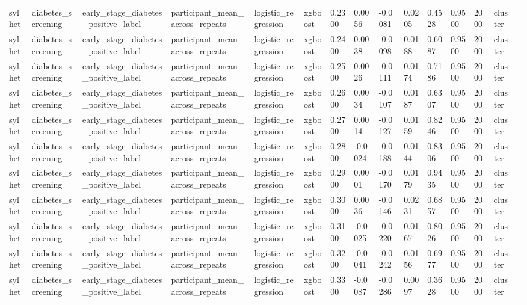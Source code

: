 \begin{tabular}{lllllllllllllll}
sylhet & diabetes\_screening & early\_stage\_diabetes\_positive\_label & participant\_mean\_across\_repeats & logistic\_regression & xgboost & 0.2300 & 0.0056 & -0.0081 & 0.0205 & 0.4528 & 0.9500 & 2000 & cluster &  \\
sylhet & diabetes\_screening & early\_stage\_diabetes\_positive\_label & participant\_mean\_across\_repeats & logistic\_regression & xgboost & 0.2400 & 0.0038 & -0.0098 & 0.0188 & 0.6087 & 0.9500 & 2000 & cluster &  \\
sylhet & diabetes\_screening & early\_stage\_diabetes\_positive\_label & participant\_mean\_across\_repeats & logistic\_regression & xgboost & 0.2500 & 0.0026 & -0.0111 & 0.0174 & 0.7186 & 0.9500 & 2000 & cluster &  \\
sylhet & diabetes\_screening & early\_stage\_diabetes\_positive\_label & participant\_mean\_across\_repeats & logistic\_regression & xgboost & 0.2600 & 0.0034 & -0.0107 & 0.0187 & 0.6307 & 0.9500 & 2000 & cluster &  \\
sylhet & diabetes\_screening & early\_stage\_diabetes\_positive\_label & participant\_mean\_across\_repeats & logistic\_regression & xgboost & 0.2700 & 0.0014 & -0.0127 & 0.0159 & 0.8246 & 0.9500 & 2000 & cluster &  \\
sylhet & diabetes\_screening & early\_stage\_diabetes\_positive\_label & participant\_mean\_across\_repeats & logistic\_regression & xgboost & 0.2800 & -0.0024 & -0.0188 & 0.0144 & 0.8306 & 0.9500 & 2000 & cluster &  \\
sylhet & diabetes\_screening & early\_stage\_diabetes\_positive\_label & participant\_mean\_across\_repeats & logistic\_regression & xgboost & 0.2900 & 0.0001 & -0.0170 & 0.0179 & 0.9435 & 0.9500 & 2000 & cluster &  \\
sylhet & diabetes\_screening & early\_stage\_diabetes\_positive\_label & participant\_mean\_across\_repeats & logistic\_regression & xgboost & 0.3000 & 0.0036 & -0.0146 & 0.0231 & 0.6857 & 0.9500 & 2000 & cluster &  \\
sylhet & diabetes\_screening & early\_stage\_diabetes\_positive\_label & participant\_mean\_across\_repeats & logistic\_regression & xgboost & 0.3100 & -0.0025 & -0.0220 & 0.0167 & 0.8026 & 0.9500 & 2000 & cluster &  \\
sylhet & diabetes\_screening & early\_stage\_diabetes\_positive\_label & participant\_mean\_across\_repeats & logistic\_regression & xgboost & 0.3200 & -0.0041 & -0.0242 & 0.0156 & 0.6977 & 0.9500 & 2000 & cluster &  \\
sylhet & diabetes\_screening & early\_stage\_diabetes\_positive\_label & participant\_mean\_across\_repeats & logistic\_regression & xgboost & 0.3300 & -0.0087 & -0.0286 & 0.0097 & 0.3628 & 0.9500 & 2000 & cluster &  \\

\end{tabular}
